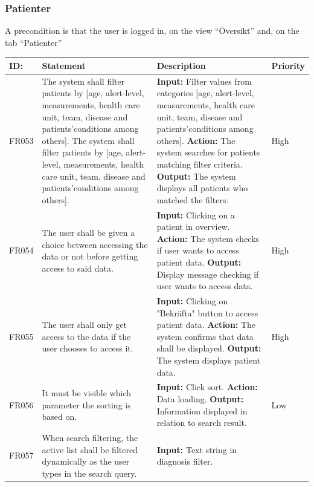 \documentclass{scrreprt}
\begin{document}
\subsubsection{Patienter}
A precondition is that the user is logged in, on the view “Översikt” and, on the tab “Patienter”
\begin{center}
\begin{tabularx}{\linewidth}{| l | X | X | l |}
\hline
\textbf{ID:} & \textbf{Statement} & \textbf{Description} & \textbf{Priority} \\ 
\hline
FR053 & The system shall filter patients by [age, alert-level, measurements, health care unit, team, disease and patients’conditions among others]. The system shall filter patients by [age, alert-level, measurements, health care unit, team, disease and patients’conditions among others]. & \textbf{Input:} Filter values from categories [age, alert-level, measurements, health care unit, team, disease and patients’conditions among others].
\newline \textbf{Action:} The system searches for patients matching filter criteria.
\newline \textbf{Output:} The system displays all patients who matched the filters. & High \\ 
\hline
FR054 & The user shall be given a choice between accessing the data or not before getting access to said data. & \textbf{Input:} Clicking on a patient in overview.
\newline \textbf{Action:} The system checks if user wants to access patient data.
\newline \textbf{Output:} Display message checking if user wants to access data. & High \\ 
\hline
FR055 & The user shall only get access to the data if the user chooses to access it. & \textbf{Input:} Clicking on "Bekräfta" button to access patient data.
\newline \textbf{Action:} The system confirms that data shall be displayed.
\newline \textbf{Output:} The system displays patient data. & High \\ 
\hline
FR056 & It must be visible which parameter the sorting is based on. & \textbf{Input:} Click sort.
\newline \textbf{Action:} Data loading.
\newline \textbf{Output:} Information displayed in relation to search result. & Low \\ 
\hline
FR057 & When search filtering, the active list shall be filtered dynamically as the user types in the search query. & \textbf{Input:} Text string in diagnosis filter.

\end{tabularx}
\end{center}
\end{document}
